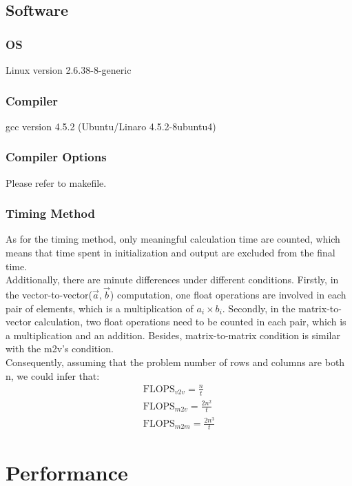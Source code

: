 \documentclass[a4paper]{article}   %
\begin{document}
\begin{CJK}{UTF8}{gbsn}
\begin{spacing}{1.2}
\subsection{Software}     %

\subsubsection{OS} 
Linux version 2.6.38-8-generic
\subsubsection{Compiler} 
gcc version 4.5.2 (Ubuntu/Linaro 4.5.2-8ubuntu4)
\subsubsection{Compiler Options}
Please refer to makefile.

\subsubsection{Timing Method}
As for the timing method, only meaningful calculation time are counted, which means that time spent in initialization and output are excluded from the final time. \\

Additionally, there are minute differences under different conditions. Firstly, in the vector-to-vector($\vec{a}, \vec{b}$) computation, one float operations are involved in each pair of elements, which is a multiplication of $a_i \times b_i$. Secondly, in the matrix-to-vector calculation, two float operations need to be counted in each pair, which is a multiplication and an addition. Besides, matrix-to-matrix condition is similar with the m2v's condition.\\

Consequently, assuming that the problem number of rows and columns are both n, we could infer that:\\

\begin{align}
\label{align:flops}
\text{FLOPS}_{v2v} = \frac{n}{t} \\
\text{FLOPS}_{m2v} = \frac{2n^2}{t} \\
\text{FLOPS}_{m2m} = \frac{2n^3}{t}
\end{align}

\section{Performance}

\end{spacing}
\end{CJK}
\end{document}
